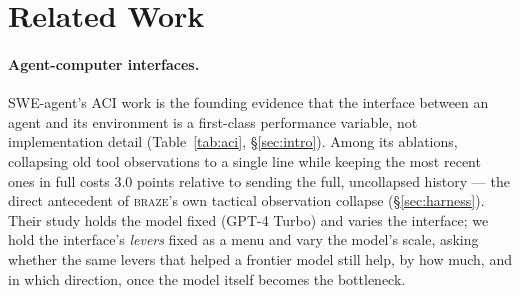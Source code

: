 \documentclass[smallcondensed,natbib]{svjour3}
\newcommand{\braze}{\textsc{braze}}
\begin{document}
\section{Related Work}\label{sec:related}

\paragraph{Agent-computer interfaces.} SWE-agent's ACI work
\citep{yang2024sweagent} is the founding evidence that the interface
between an agent and its environment is a first-class performance
variable, not implementation detail (Table~\ref{tab:aci},
\S\ref{sec:intro}). Among its ablations, collapsing old tool
observations to a single line while keeping the most recent ones in
full costs 3.0 points relative to sending the full, uncollapsed history
--- the direct antecedent of \braze{}'s own tactical observation
collapse (\S\ref{sec:harness}). Their study holds the model fixed (GPT-4
Turbo) and varies the interface; we hold the interface's \emph{levers}
fixed as a menu and vary the model's scale, asking whether the same
levers that helped a frontier model still help, by how much, and in
which direction, once the model itself becomes the bottleneck.
\end{document}
